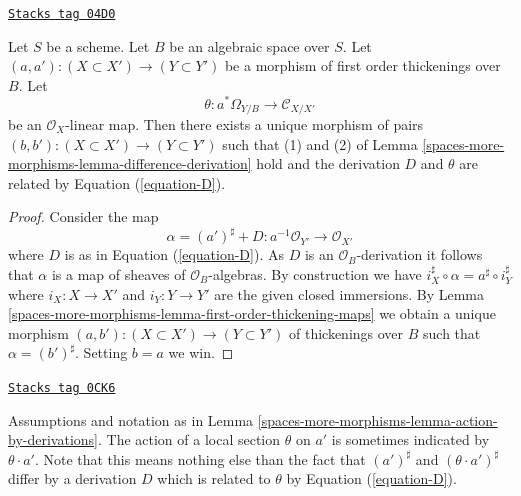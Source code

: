 \begin{lemma}
\label{spaces-more-morphisms-lemma-action-by-derivations}
\href{https://stacks.math.columbia.edu/tag/04D0}{\texttt{Stacks tag 04D0}}

Let $S$ be a scheme. Let $B$ be an algebraic space over $S$.
Let $(a, a') : (X \subset X') \to (Y \subset Y')$
be a morphism of first order thickenings over $B$.
Let
$$
\theta : a^*\Omega_{Y/B} \to \mathcal{C}_{X/X'}
$$
be an $\mathcal{O}_X$-linear map. Then there exists a unique morphism of pairs
$(b, b') : (X \subset X') \to (Y \subset Y')$ such that
(1) and (2) of
Lemma \ref{spaces-more-morphisms-lemma-difference-derivation}
hold and the derivation $D$ and $\theta$ are related by
Equation (\ref{equation-D}).
\end{lemma}

\begin{proof}
Consider the map
$$
\alpha = (a')^\sharp + D : a^{-1}\mathcal{O}_{Y'} \to \mathcal{O}_{X'}
$$
where $D$ is as in Equation (\ref{equation-D}). As $D$ is an
$\mathcal{O}_B$-derivation it follows that $\alpha$ is a map of
sheaves of $\mathcal{O}_B$-algebras. By construction we have
$i_X^\sharp \circ \alpha = a^\sharp \circ i_Y^\sharp$ where
$i_X : X \to X'$ and $i_Y : Y \to Y'$ are the given closed immersions. By
Lemma \ref{spaces-more-morphisms-lemma-first-order-thickening-maps}
we obtain a unique morphism
$(a, b') : (X  \subset X') \to (Y \subset Y')$ of thickenings
over $B$ such that $\alpha = (b')^\sharp$. Setting $b = a$
we win.
\end{proof}

\begin{remark}
\label{spaces-more-morphisms-remark-action-by-derivations}
\href{https://stacks.math.columbia.edu/tag/0CK6}{\texttt{Stacks tag 0CK6}}

Assumptions and notation as in Lemma \ref{spaces-more-morphisms-lemma-action-by-derivations}.
The action of a local section $\theta$ on $a'$ is sometimes indicated by
$\theta \cdot a'$. Note that this means nothing else than the fact
that $(a')^\sharp$ and $(\theta \cdot a')^\sharp$ differ by a derivation
$D$ which is related to $\theta$ by Equation (\ref{equation-D}).
\end{remark}

